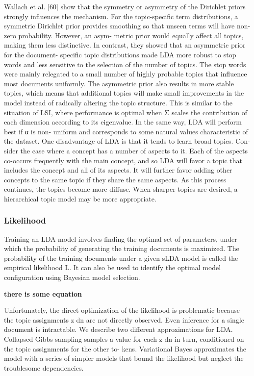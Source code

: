 Wallach et al. [60] show that the symmetry or asymmetry of the Dirichlet priors strongly influences the mechanism. For the topic-specific term distributions, a symmetric Dirichlet prior provides smoothing so that unseen terms will have non-zero probability. However, an asym- metric prior would equally affect all topics, making them less distinctive. In contrast, they showed that an asymmetric prior for the document- specific topic distributions made LDA more robust to stop words and less sensitive to the selection of the number of topics. The stop words were mainly relegated to a small number of highly probable topics that influence most documents uniformly. The asymmetric prior also results in more stable topics, which means that additional topics will make small improvements in the model instead of radically altering the topic structure. This is similar to the situation of LSI, where performance is optimal when Σ scales the contribution of each dimension according to its eigenvalue. In the same way, LDA will perform best if α is non- uniform and corresponds to some natural values characteristic of the dataset.
One disadvantage of LDA is that it tends to learn broad topics. Con- sider the case where a concept has a number of aspects to it. Each of the aspects co-occurs frequently with the main concept, and so LDA will favor a topic that includes the concept and all of its aspects. It will further favor adding other concepts to the same topic if they share the same aspects. As this process continues, the topics become more diffuse. When sharper topics are desired, a hierarchical topic model may be more appropriate.

\subsubsection{Likelihood} Training an LDA model involves finding the optimal set of parameters, under which the probability of generating the training documents is maximized. The probability of the training documents under a given sLDA model is called the empirical likelihood L. It can also be used to identify the optimal model configuration using Bayesian model selection.

\textbf{there is some equation}

Unfortunately, the direct optimization of the likelihood is problematic because the topic assignments z dn are not directly observed. Even inference for a single document is intractable. We describe two different approximations for LDA. Collapsed Gibbs sampling samples a value for each z dn in turn, conditioned on the topic assignments for the other to- kens. Variational Bayes approximates the model with a series of simpler models that bound the likelihood but neglect the troublesome dependencies.



